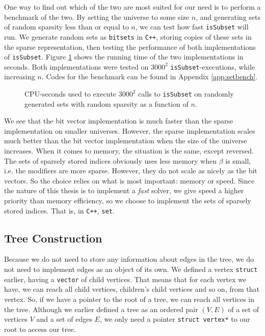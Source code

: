 One way to find out which of the two are most suited for our need is to perform
a benchmark of the two.
By setting the universe to some size $n$, and generating sets of
random sparsity less than or equal to $n$, we can test how fast
\texttt{isSubset} will run.
We generate random sets as \texttt{bitsets} in \texttt{C++}, storing copies
of these sets in the sparse representation, then testing the performance 
of both implementations of \texttt{isSubset}.
Figure \ref{fig:setspeed}
shows the running time of the two implementations in seconds. Both
implementations were tested on $3000^2$ \texttt{isSubset}-executions, while
increasing $n$.
Codes for the benchmark can be found in Appendix \ref{app:setbench}.
\begin{figure}[ht!]
\centering

\caption{CPU-seconds used to execute $3000^2$ calls to \texttt{isSubset} on
         randomly generated sets with random sparsity as a function of $n$.}
\label{fig:setspeed}
\end{figure}

We see that the bit vector implementation is much faster than the sparse
implementation on smaller universes. However, the sparse implementation
scales much better than the bit vector implementation when the size of
the universe increases. When it comes to memory, the situation is the same,
except reversed. The sets of sparsely stored indices obviously uses less
memory when $\beta$ is small, i.e. the modifiers are more sparse. However, they
do not scale as nicely as the bit vectors. So the choice relies on what is
most important: memory or speed. Since the nature of this thesis is to
implement a \emph{fast} solver, we give speed a higher priority than memory 
efficiency, so we choose to implement the sets of sparsely stored
indices. That is, in \texttt{C++}, \texttt{set}.

\subsection{Tree Construction}
Because we do not need to store any information about edges in the tree,
we do not need to implement edges as an object of its own. We defined
a vertex \texttt{struct} earlier, having a \texttt{vector} of child
vertices. That means that for each vertex we have, we can reach all child
vertices, children's child vertices and so on, from that vertex.
So, if we have a pointer to the root of a tree, we can reach all vertices
in the tree. Although we earlier defined a tree as an ordered pair
$(V, E)$ of a set of vertices $V$ and a set of edges $E$, we only need a
pointer \texttt{struct vertex*} to our root to access our tree.


